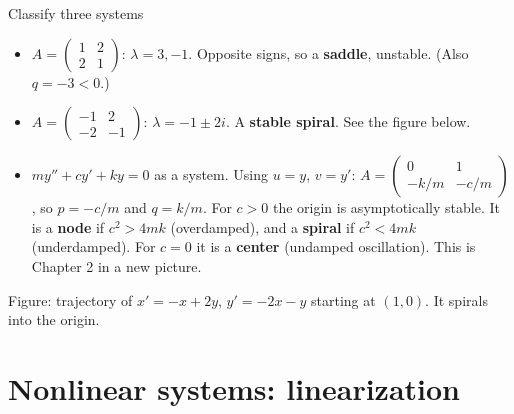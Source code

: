 \begin{examplebox}{Classify three systems}
\begin{itemize}
  \item $A = \begin{pmatrix}1&2\\2&1\end{pmatrix}$: $\lambda = 3, -1$. Opposite signs, so a \textbf{saddle}, unstable. (Also $q = -3<0$.)
  \item $A = \begin{pmatrix}-1&2\\-2&-1\end{pmatrix}$: $\lambda = -1\pm2i$. A \textbf{stable spiral}. See the figure below.
  \item $my''+cy'+ky=0$ as a system. Using $u=y$, $v=y'$: $A = \begin{pmatrix}0&1\\-k/m&-c/m\end{pmatrix}$, so $p = -c/m$ and $q = k/m$. For $c>0$ the origin is asymptotically stable. It is a \textbf{node} if $c^2>4mk$ (overdamped), and a \textbf{spiral} if $c^2<4mk$ (underdamped). For $c=0$ it is a \textbf{center} (undamped oscillation). This is Chapter 2 in a new picture.
\end{itemize}
\end{examplebox}

\begin{center}

{\small Figure: trajectory of $x'=-x+2y$, $y'=-2x-y$ starting at $(1,0)$. It spirals into the origin.}
\end{center}

\section{Nonlinear systems: linearization}

